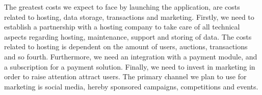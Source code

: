 The greatest costs we expect to face by launching the application, are costs related to hosting, data storage, transactions and marketing. Firstly, we need to establish a partnership with a hosting company to take care of all technical aspects regarding hosting, maintenance, support and storing of data. The costs related to hosting is dependent on the amount of users, auctions, transactions and so fourth. Furthermore, we need an integration with a payment module, and a subscription for a payment solution. Finally, we need to invest in marketing in order to raise attention attract users. The primary channel we plan to use for marketing is social media, hereby sponsored campaigns, competitions and events. 